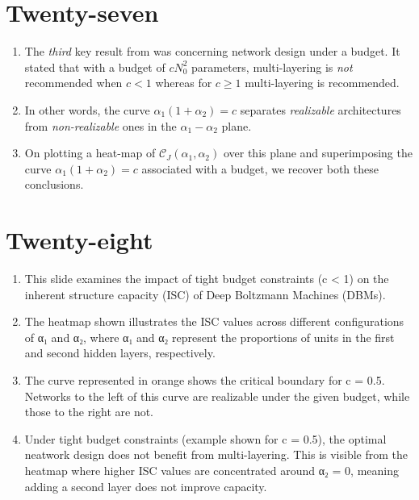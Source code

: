 \documentclass{article}
\begin{document}
\section*{Twenty-seven}
\begin{enumerate}
    \item The \emph{third} key result from \cite{bansal2018using} was concerning network design under a budget. It stated that with a budget of \(c N_{0}^{2}\) parameters, multi-layering is \emph{not} recommended when \(c < 1\) whereas for \(c \geq 1\) multi-layering is recommended.
    \item In other words, the curve \(\alpha_{1} (1 + \alpha_{2}) = c\) separates \emph{realizable} architectures from \emph{non-realizable} ones in the \(\alpha_{1} - \alpha_{2}\) plane.
    \item On plotting a heat-map of \(\mathcal{C}_{J} (\alpha_{1}, \alpha_{2})\) over this plane and superimposing the curve \(\alpha_{1} (1 + \alpha_{2}) = c\) associated with a budget, we recover both these conclusions.
\end{enumerate}

\section*{Twenty-eight}
\begin{enumerate}
    \item This slide examines the impact of tight budget constraints (c < 1) on the inherent structure capacity (ISC) of Deep Boltzmann Machines (DBMs).
    \item The heatmap shown illustrates the ISC values across different configurations of α₁ and α₂, where α₁ and α₂ represent the proportions of units in the first and second hidden layers, respectively.
    \item The curve represented in orange shows the critical boundary for c = 0.5. Networks to the left of this curve are realizable under the given budget, while those to the right are not.
    \item Under tight budget constraints (example shown for c = 0.5), the optimal neatwork design does not benefit from multi-layering. This is visible from the heatmap where higher ISC values are concentrated around α₂ = 0, meaning adding a second layer does not improve capacity.
\end{enumerate}
\end{document}
